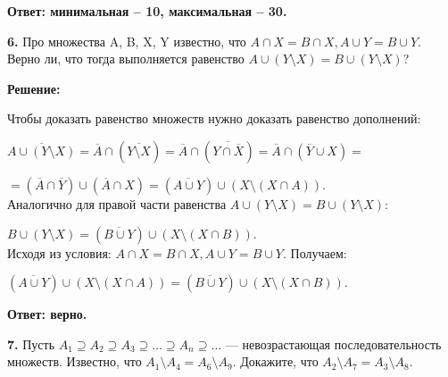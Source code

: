 \documentclass[a4paper,12pt]{article} %
\begin{document}
\begin{flushright}
\begin{large}
\textbf {Ответ: минимальная -- 10, максимальная -- 30.}
\end{large}
\end{flushright}

{\bf 6.} Про множества A, B, X, Y известно, что $A \cap X = B \cap X, A \cup Y = B \cup Y .$ Верно ли, что тогда выполняется равенство $A \cup (Y \setminus X) = B \cup (Y \setminus X)$?
\begin{center}
\bfseries
{\Large Решение: }
\end{center}
Чтобы доказать равенство множеств нужно доказать равенство дополнений:

$\overline{A\cup (Y \setminus X)}= \overline{A}\cap (\overline{Y\setminus X}) = \overline{A}\cap (\overline{Y\cap\overline{X}}) = \overline{A}\cap (\overline{Y}\cup X) =$

$=(\overline{A} \cap \overline{Y}) \cup (\overline{A} \cap X) = (\overline{A \cup Y}) \cup (X \setminus (X \cap A)).$\\
Аналогично для правой части равенства $A \cup (Y \setminus X) = B \cup (Y \setminus X)$:

$B \cup (Y \setminus X) = (\overline{B \cup Y}) \cup (X \setminus (X \cap B)).$\\
Исходя из условия: $A \cap X = B \cap X, A \cup Y = B \cup Y .$ 
Получаем:

$ (\overline{A \cup Y}) \cup (X \setminus (X \cap A)) = (\overline{B \cup Y}) \cup (X \setminus (X \cap B)).$
	

\begin{flushright}
\begin{large}
\textbf {Ответ: верно.}
\end{large}
\end{flushright}


{\bf 7.} Пусть $A_{1} \supseteq A_{2} \supseteq A_{3} \supseteq \ldots \supseteq A_{n} \supseteq \ldots $ — невозрастающая последовательность множеств.
Известно, что $A_{1} \setminus A_{4} = A_{6} \setminus A_{9}$. Докажите, что $A_{2} \setminus A_{7} = A_{3} \setminus A_{8}$.
\end{document}
